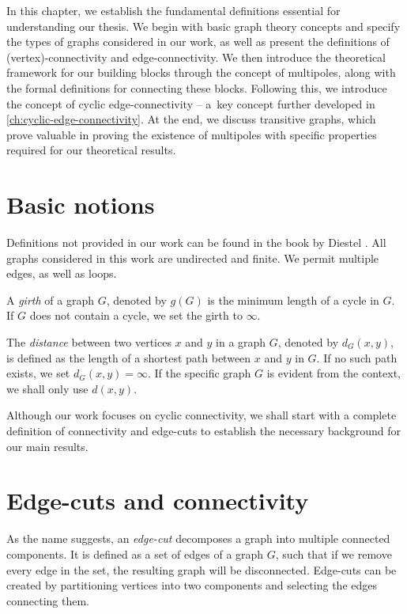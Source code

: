 \documentclass[12pt, twoside]{book}
\begin{document}
In this chapter, we establish the fundamental definitions essential for understanding our thesis. We begin with basic graph theory concepts and specify the types of graphs considered in our work, as well as present the definitions of (vertex)-connectivity and edge-connectivity. We then introduce the theoretical framework for our building blocks through the concept of multipoles, along with the formal definitions for connecting these blocks. Following this, we introduce the concept of cyclic edge-connectivity -- a~key concept further developed in \cref{ch:cyclic-edge-connectivity}. At the end, we discuss transitive graphs, which prove valuable in proving the existence of multipoles with specific properties required for our theoretical results.

\section{Basic notions}

Definitions not provided in our work can be found in the book  by Diestel \cite{Diestel}. All graphs considered in this work are undirected and finite. We permit multiple edges, as well as loops.

A \textit{girth} of a graph $G$, denoted by $g(G)$ is the minimum length of a cycle in $G$. If $G$ does not contain a cycle, we set the girth to $\infty$.

The \textit{distance} between two vertices $x$ and $y$ in a graph $G$, denoted by $d_G(x,y)$, is defined as the length of a shortest path between $x$ and $y$ in $G$. If no such path exists, we set $d_G(x,y)=\infty$. If the specific graph $G$ is evident from the context, we shall only use $d(x,y)$.

Although our work focuses on cyclic connectivity, we shall start with a complete definition of connectivity and edge-cuts to establish the necessary background for our main results.

\section{Edge-cuts and connectivity}\label{sec:edge-cuts}

As the name suggests, an \textit{edge-cut} decomposes a graph into multiple connected components. It is defined as a set of edges of a graph $G$, such that if we remove every edge in the set, the resulting graph will be disconnected. Edge-cuts can be created by partitioning vertices into two components and selecting the edges connecting them.
\end{document}
